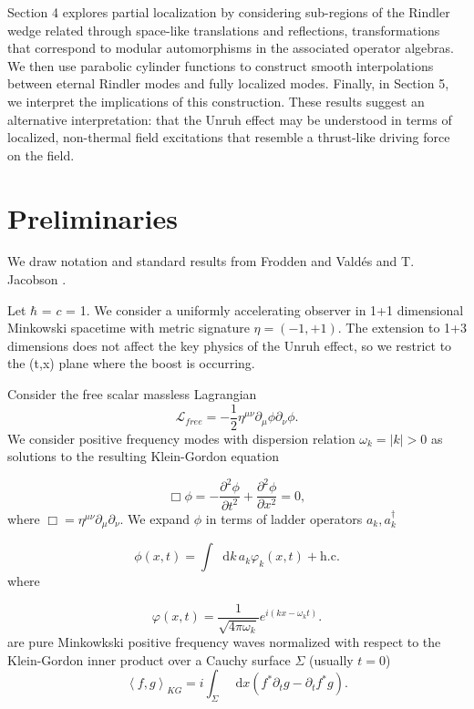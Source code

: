 \documentclass[12pt,a4paper]{article}
\newcommand*\diff{\mathop{}\!\mathrm{d}}
\begin{document}
Section 4 explores partial localization by considering sub-regions of the Rindler wedge related through space-like translations and reflections, transformations that correspond to modular automorphisms in the associated operator algebras. We then use parabolic cylinder functions to construct smooth interpolations between eternal Rindler modes and fully localized modes. Finally, in Section 5, we interpret the implications of this construction. These results suggest an alternative interpretation: that the Unruh effect may be understood in terms of localized, non-thermal field excitations that resemble a thrust-like driving force on the field.

\section{Preliminaries}

We draw notation and standard results from Frodden and Vald{\'{e}}s \cite{frodden2018unruh} and T. Jacobson \cite{jacobson2005introduction}.

Let $\hbar$ = $c$ = 1. We consider a uniformly accelerating observer in 1+1 dimensional Minkowski spacetime with metric signature $\eta=(-1,+1)$. The extension to 1+3 dimensions does not affect the key physics of the Unruh effect, so we restrict to the (t,x) plane where the boost is occurring.

Consider the free scalar massless Lagrangian
\begin{equation}
\mathscr{L}_{free} = -\frac{1}{2} \eta^{\mu\nu}\partial_\mu \phi \partial_\nu \phi.
\end{equation}
We consider positive frequency modes with dispersion relation $\omega_k = |k| > 0$ as solutions to the resulting Klein-Gordon equation 

\begin{equation}
  \Box \phi = -\frac{\partial^2 \phi}{\partial t^2} + \frac{\partial^2 \phi}{\partial x^2} = 0,
 \label{massless-wave-eq}
\end{equation}
where $\Box = \eta^{\mu\nu} \partial_\mu \partial_\nu$. We expand $\phi$ in terms of ladder operators $a_k, a_k^\dagger$

\begin{equation}
  \phi(x,t) = \int \diff k \, a_k \varphi_k(x,t) + \text{h.c.}
\end{equation}
where

\begin{equation}
  \varphi(x,t) = \frac{1}{\sqrt{4\pi\omega_k}} e^{i(kx - \omega_k t)}.
\label{amode}
\end{equation}
are pure Minkowkski positive frequency waves normalized with respect to the Klein-Gordon inner product over a Cauchy surface $\Sigma$ (usually $t = 0$)
\begin{equation}
  \left<f, g\right>_{KG} = i \int_\Sigma \diff x (f^* \partial_t g - \partial_t f^* g).
\end{equation}
\end{document}
